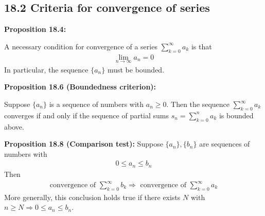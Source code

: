\documentclass[11pt]{article}
\begin{document}
\subsection*{18.2 Criteria for convergence of series}


\textbf{Proposition 18.4:} 

A necessary condition for convergence of a series $\sum_{k=0}^\infty a_k$ is that 
\begin{align*}
    \lim_{n \to \infty} a_n = 0
\end{align*}
In particular, the sequence $\{a_n\}$ must be bounded.

\textbf{Proposition 18.6 (Boundedness criterion):}

Suppose $\{a_n\}$ is a sequence of numbers with $a_n \geq 0 $. Then the sequence $\sum_{k=0}^\infty a_k$ converges if and only if the sequence of partial sums $s_n = \sum_{k=0}^n a_k$ is bounded above.

\textbf{Proposition 18.8 (Comparison test):} Suppose $\{a_n\}, \{b_n\}$ are sequences of numbers with 
\begin{align*}
    0 \leq a_n \leq b_n
\end{align*}
Then 
\begin{align*}
    \text{convergence of }\sum_{k=0}^\infty b_k \Rightarrow \text{ convergence of } \sum_{k=0}^\infty a_k
\end{align*}
More generally, this conclusion holds true if there exists $N$ with $n \geq N \Rightarrow 0 \leq a_n \leq b_n$. 
\end{document}
